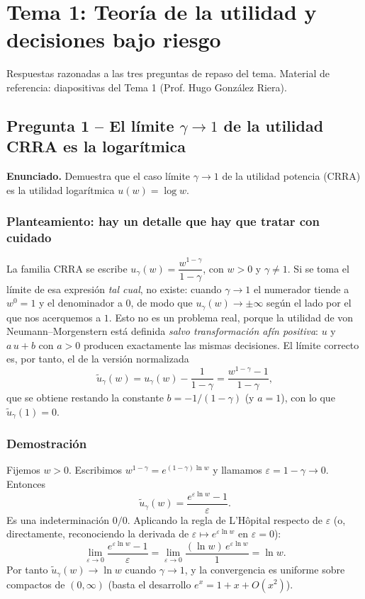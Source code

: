 \documentclass[a4paper,12pt]{article}
\begin{document}
\restoregeometry
\newpage
{}
\setcounter{page}{1}

\section{Tema 1: Teoría de la utilidad y decisiones bajo riesgo}
\label{sec:tema1repaso}
\noindent
Respuestas razonadas a las tres preguntas de repaso del tema. Material de referencia: diapositivas del Tema 1 (Prof. Hugo González Riera).

\subsection{Pregunta 1 -- El l\'imite $\gamma\to1$ de la utilidad CRRA es la logar\'itmica}

\noindent\textbf{Enunciado.} Demuestra que el caso l\'imite $\gamma\to1$ de la utilidad potencia (CRRA) es la utilidad logar\'itmica $u(w)=\log w$.

\subsubsection*{Planteamiento: hay un detalle que hay que tratar con cuidado}
La familia CRRA se escribe $u_\gamma(w)=\dfrac{w^{1-\gamma}}{1-\gamma}$, con $w>0$ y $\gamma\neq1$. Si se toma el l\'imite de esa expresi\'on \emph{tal cual}, no existe: cuando $\gamma\to1$ el numerador tiende a $w^0=1$ y el denominador a $0$, de modo que $u_\gamma(w)\to\pm\infty$ seg\'un el lado por el que nos acerquemos a $1$. Esto no es un problema real, porque la utilidad de von Neumann--Morgenstern est\'a definida \emph{salvo transformaci\'on af\'in positiva}: $u$ y $a\,u+b$ con $a>0$ producen exactamente las mismas decisiones. El l\'imite correcto es, por tanto, el de la versi\'on normalizada
\begin{equation}\label{eq:norm}
\tilde u_\gamma(w)=u_\gamma(w)-\frac{1}{1-\gamma}=\frac{w^{1-\gamma}-1}{1-\gamma},
\end{equation}
que se obtiene restando la constante $b=-1/(1-\gamma)$ (y $a=1$), con lo que $\tilde u_\gamma(1)=0$.

\subsubsection*{Demostraci\'on}
Fijemos $w>0$. Escribimos $w^{1-\gamma}=e^{(1-\gamma)\ln w}$ y llamamos $\varepsilon=1-\gamma\to0$. Entonces
\[
\tilde u_\gamma(w)=\frac{e^{\varepsilon\ln w}-1}{\varepsilon}.
\]
Es una indeterminaci\'on $0/0$. Aplicando la regla de L'H\^opital respecto de $\varepsilon$ (o, directamente, reconociendo la derivada de $\varepsilon\mapsto e^{\varepsilon\ln w}$ en $\varepsilon=0$):
\[
\lim_{\varepsilon\to0}\frac{e^{\varepsilon\ln w}-1}{\varepsilon}=\lim_{\varepsilon\to0}\frac{(\ln w)\,e^{\varepsilon\ln w}}{1}=\ln w .
\]
Por tanto $\tilde u_\gamma(w)\to\ln w$ cuando $\gamma\to1$, y la convergencia es uniforme sobre compactos de $(0,\infty)$ (basta el desarrollo $e^{x}=1+x+O(x^2)$).
\end{document}
